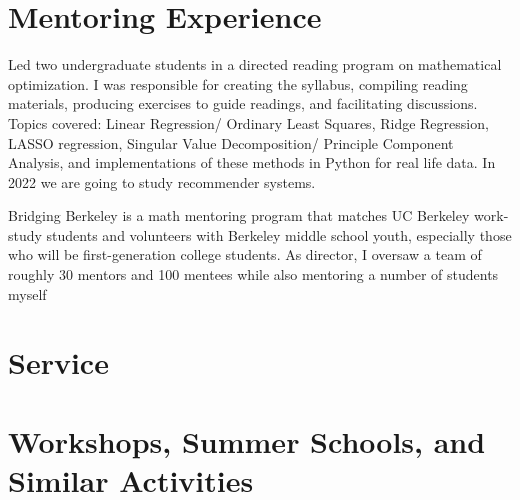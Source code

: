 \documentclass[11pt,letter]{moderncv}
\begin{document}
\section{Mentoring Experience}
\vspace{0.05in}
\begin{itemize}
 {Led two undergraduate students in a directed reading program on mathematical optimization.  I was responsible for creating the syllabus, compiling reading materials, producing exercises to guide readings, and facilitating discussions. Topics covered: Linear Regression/ Ordinary Least Squares, Ridge Regression, LASSO regression, Singular Value Decomposition/ Principle Component Analysis, and implementations of these methods in Python for real life data. In 2022 we are going to study recommender systems.}{}{}{}{}
\end{itemize}
\vspace{0.05in}
\begin{itemize}
 {Bridging Berkeley is a math mentoring program that matches UC Berkeley work-study students and volunteers with Berkeley middle school youth, especially those who will be first-generation college students. As director, I oversaw a team of roughly 30 mentors and 100 mentees while also mentoring a number of students myself}{}{}{}{}
\end{itemize}
\vspace{0.05in}


\section{Service}

\section{Workshops, Summer Schools, and Similar Activities}
\vspace{0.05in}
\vspace{0.05in}
\vspace{0.05in}
\vspace{0.05in}
\end{document}
